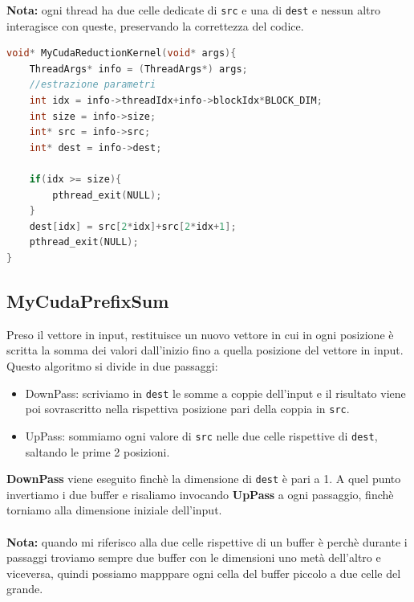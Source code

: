 \documentclass[binding=0.6cm, noexaminfo]{sapthesis}\usepackage{microtype}
\begin{document}
\textbf{Nota:} ogni thread ha due celle dedicate di \texttt{src} e una di \texttt{dest}  e nessun altro interagisce con queste, preservando 
la correttezza del codice. 

\begin{lstlisting}[language=C]
void* MyCudaReductionKernel(void* args){
    ThreadArgs* info = (ThreadArgs*) args;
    //estrazione parametri 
    int idx = info->threadIdx+info->blockIdx*BLOCK_DIM;
    int size = info->size;
    int* src = info->src;
    int* dest = info->dest;

    if(idx >= size){
        pthread_exit(NULL);
    }
    dest[idx] = src[2*idx]+src[2*idx+1];
    pthread_exit(NULL);
}
\end{lstlisting}

\subsection{MyCudaPrefixSum}
Preso il vettore in input, restituisce un nuovo vettore in cui in ogni posizione è scritta la somma dei valori dall'inizio fino a quella posizione del vettore in input. Questo algoritmo si divide in due passaggi: 
\begin{itemize}
    \item DownPass: scriviamo in \texttt{dest} le somme a coppie dell'input e il risultato
     viene poi sovrascritto nella rispettiva posizione pari della coppia in \texttt{src}. 
    \item UpPass: sommiamo ogni valore di \texttt{src} nelle due celle rispettive di \texttt{dest}, saltando 
    le prime 2 posizioni.   
\end{itemize}
\textbf{DownPass} viene eseguito finchè la dimensione di \texttt{dest} è pari a 1. A quel punto invertiamo 
i due buffer e risaliamo invocando \textbf{UpPass} a ogni passaggio, finchè torniamo alla dimensione iniziale dell'input.
\\\\\textbf{Nota:} quando mi riferisco alla due celle rispettive di un buffer è perchè durante i passaggi troviamo sempre due buffer con le dimensioni uno metà dell'altro e viceversa, quindi possiamo mapppare ogni cella del buffer piccolo a due celle del grande. \\
\end{document}
